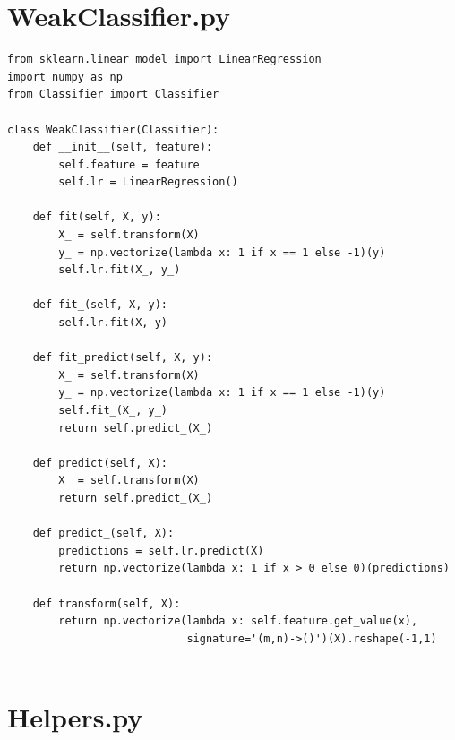 \section*{WeakClassifier.py}

\begin{lstlisting}[style=py]
from sklearn.linear_model import LinearRegression
import numpy as np
from Classifier import Classifier

class WeakClassifier(Classifier):
    def __init__(self, feature):
        self.feature = feature
        self.lr = LinearRegression()

    def fit(self, X, y):
        X_ = self.transform(X)
        y_ = np.vectorize(lambda x: 1 if x == 1 else -1)(y)
        self.lr.fit(X_, y_)

    def fit_(self, X, y):
        self.lr.fit(X, y)

    def fit_predict(self, X, y):
        X_ = self.transform(X)
        y_ = np.vectorize(lambda x: 1 if x == 1 else -1)(y)
        self.fit_(X_, y_)
        return self.predict_(X_)

    def predict(self, X):
        X_ = self.transform(X)
        return self.predict_(X_)

    def predict_(self, X):
        predictions = self.lr.predict(X)
        return np.vectorize(lambda x: 1 if x > 0 else 0)(predictions)

    def transform(self, X):
        return np.vectorize(lambda x: self.feature.get_value(x),
                            signature='(m,n)->()')(X).reshape(-1,1)


\end{lstlisting}

\section*{Helpers.py}

